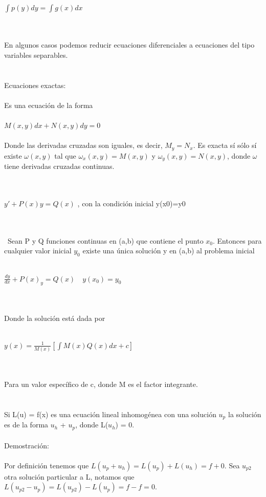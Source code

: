 \documentclass[a4paper,10pt]{article}
\begin{document}
\centerline{$\int p(y) dy = \int g(x) dx $}\\\\
En algunos casos podemos reducir ecuaciones diferenciales a ecuaciones del tipo variables separables.\\\\\\
Ecuaciones exactas:\\\\
Es una ecuación de la forma\\\\ 
$M(x,y)dx + N(x,y) dy = 0$\\\\
Donde las derivadas cruzadas son iguales, es decir, $M_y=N_x$. Es exacta sí sólo sí existe $\omega (x,y)$ tal que $\omega_x (x,y)= M(x,y)$ y $\omega_y (x,y)= N(x,y)$, donde $\omega$ tiene derivadas cruzadas continuas.\\\\\\
\centerline{$y'+P(x)y=Q(x)$ , con la condición inicial y(x0)=y0}\\\\\
Sean P y Q funciones continuas en (a,b) que contiene el punto $x_0$. Entonces para cualquier valor inicial $y_0$ existe una única solución y en (a,b) al problema inicial\\\\
\centerline{$\frac{dy}{dx} + P(x)_y =Q(x) \quad y(x_0)= y_0$}\\\\
Donde la solución está dada por\\\\
\centerline{$y(x)=\frac{1}{M(x)}[\int M(x) Q(x) dx + c]$}\\\\
Para un valor específico de c, donde M es el factor integrante.\\\\\\
Si L(u) = f(x) es una ecuación lineal inhomogénea con una solución $u_p$  la solución es de la forma $u_h$ + $u_p$, donde L($u_h$) = 0. 
\\\\
Demostración:\\\\
Por definición tenemos que $L(u_p + u_h) = L(u_p) + L(u_h) = f + 0$. Sea $u_{p2}$ otra solución particular a L, notamos que $L(u_{p2} - u_p)=L(u_{p2}) - L(u_p) = f - f = 0$.\\\\
\end{document}
